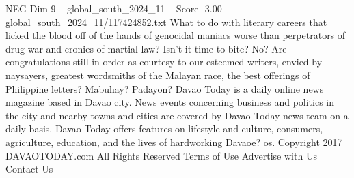 \begin{textsample}{NEG Dim 9 – global\_south\_2024\_11 – Score -3.00 – global\_south\_2024\_11/117424852.txt}
What to do with literary careers that licked the blood off of the hands of genocidal maniacs worse than perpetrators of drug war and cronies of martial law?
Isn't it time to bite?
No?
Are congratulations still in order as courtesy to our esteemed writers, envied by naysayers, greatest wordsmiths of the Malayan race, the best offerings of Philippine letters?
Mabuhay?
Padayon?
Davao Today is a daily online news magazine based in Davao city.
News events concerning business and politics in the city and nearby towns and cities are covered by Davao Today news team on a daily basis.
Davao Today offers features on lifestyle and culture, consumers, agriculture, education, and the lives of hardworking Davaoe? os.
Copyright 2017 DAVAOTODAY.com All Rights Reserved Terms of Use Advertise with Us Contact Us

\end{textsample}
